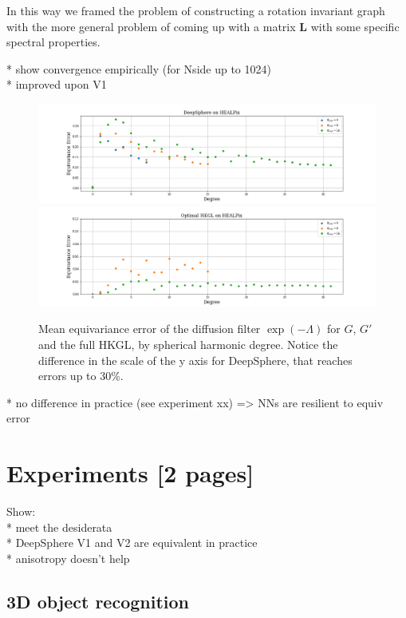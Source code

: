\documentclass{article} %
\begin{document}
In this way we framed the problem of constructing a rotation invariant graph with the more general problem of coming up with a matrix $\mathbf L$ with some specific spectral properties.

* show convergence empirically (for Nside up to 1024) \\
* improved upon V1\\

\begin{figure}[h]
	\centering
	\includegraphics[width=\textwidth]{figures/DeepSphereonHEALPix.png}	
	\includegraphics[width=\textwidth]{figures/OptimalHKGLonHEALPix.png}	
	\caption{\label{fig:DeepSphere equivariance error}Mean equivariance error of the diffusion filter $\exp(-\Lambda)$ for $G$, $G'$ and the full HKGL, by spherical harmonic degree. Notice the difference in the scale of the y axis for DeepSphere, that reaches errors up to 30\%.}
\end{figure}

* no difference in practice (see experiment xx) => NNs are resilient to equiv error\\

\section{Experiments [2 pages]}

Show: \\
* meet the desiderata \\
* DeepSphere V1 and V2 are equivalent in practice \\
* anisotropy doesn't help \\

\subsection{3D object recognition}
\end{document}
